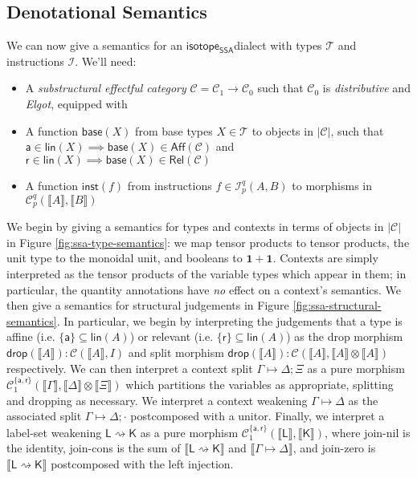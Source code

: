 \documentclass[acmsmall,screen,review]{acmart}
\newcommand{\mc}[1]{\ensuremath{\mathcal{#1}}}
\newcommand{\mb}[1]{\ensuremath{\mathbf{#1}}}
\newcommand{\ms}[1]{\ensuremath{\mathsf{#1}}}
\newcommand{\csplits}[3]{#1 \mapsto #2;#3}
\newcommand{\cwk}[2]{#1 \mapsto #2}
\newcommand{\lwk}[2]{#1 \rightsquigarrow #2}
\newcommand{\tlin}[2]{#2 \subseteq \ms{lin}(#1)}
\newcommand{\rle}[1]{{\scriptsize\textsf{#1}}}
\newcommand{\taff}{{\{\ms{a}\}}}
\newcommand{\trel}{{\{\ms{r}\}}}
\newcommand{\tint}{{\{\ms{a}, \ms{r}\}}}
\newcommand{\dnt}[1]{\llbracket{#1}\rrbracket}
\newcommand{\isotopessa}{\ms{isotope_{SSA}}}
\begin{document}
\subsection{Denotational Semantics}

We can now give a semantics for an \isotopessa dialect with types
\(\mc{T}\) and instructions \(\mc{I}\). We'll need:
\begin{itemize}
  \item A \textit{substructural effectful category} \(\mc{C} = \mc{C}_1 \to
  \mc{C}_0\) such that \(\mc{C}_0\) is \textit{distributive} and \textit{Elgot},
  equipped with
  \item A function \(\ms{base}(X)\) from base types \(X \in \mc{T}\) to objects
  in \(|\mc{C}|\), such that \(\ms{a} \in \ms{lin}(X) \implies \ms{base}(X) \in
  \ms{Aff}(\mc{C})\) and \(\ms{r} \in \ms{lin}(X) \implies \ms{base}(X) \in
  \ms{Rel}(\mc{C})\)
  \item A function \(\ms{inst}(f)\) from instructions \(f \in \mc{I}_p^q(A, B)\)
  to morphisms in \(\mc{C}_p^q(\dnt{A}, \dnt{B})\)
\end{itemize}
We begin by giving a semantics for types and contexts in terms of objects in
\(|\mc{C}|\) in Figure \ref{fig:ssa-type-semantics}: we map tensor products to
tensor products, the unit type to the monoidal unit, and booleans to \(\mb{1} +
\mb{1}\). Contexts are simply interpreted as the tensor products of the variable
types which appear in them; in particular, the quantity annotations have
\textit{no} effect on a context's semantics. We then give a semantics for
structural judgements in Figure \ref{fig:ssa-structural-semantics}. In
particular, we begin by interpreting the judgements that a type is affine (i.e.
\(\tlin{A}{\taff}\)) or relevant (i.e. \(\tlin{A}{\trel}\)) as the drop morphism
\(\ms{drop}(\dnt{A}): \mc{C}(\dnt{A}, I)\) and split morphism
\(\ms{drop}(\dnt{A}): \mc{C}(\dnt{A}, \dnt{A} \otimes \dnt{A})\) respectively.
We can then interpret a context split \(\csplits{\Gamma}{\Delta}{\Xi}\) as a
pure morphism \(\mc{C}^\tint_1(\dnt{\Gamma}, \dnt{\Delta} \otimes \dnt{\Xi})\)
which partitions the variables as appropriate, splitting and dropping as
necessary. We interpret a context weakening \(\cwk{\Gamma}{\Delta}\) as the
associated split \(\csplits{\Gamma}{\Delta}{\cdot}\) postcomposed with a unitor.
Finally, we interpret a label-set weakening \(\lwk{\ms{L}}{\ms{K}}\) as a pure
morphism \(\mc{C}^\tint_1(\dnt{\ms{L}}, \dnt{\ms{K}})\), where \rle{join-nil} is
the identity, \rle{join-cons} is the sum of \(\dnt{\lwk{\ms{L}}{\ms{K}}}\) and
\(\dnt{\cwk{\Gamma}{\Delta}}\), and \rle{join-zero} is
\(\dnt{\lwk{\ms{L}}{\ms{K}}}\) postcomposed with the left injection.
\end{document}
